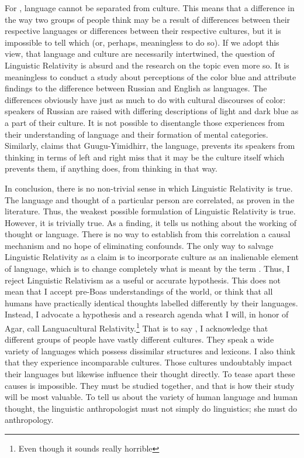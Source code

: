 \documentclass[doc,12pt]{apa6}
\begin{document}
For , language cannot be separated from culture. This means that
a difference in the way two groups of people think may be a result of
differences between their respective languages or differences between their
respective cultures, but it is impossible to tell which (or, perhaps,
meaningless to do so). If we adopt this view, that language and culture are
necessarily intertwined, the question of Linguistic Relativity is absurd and
the research on the topic even more so. It is meaningless to conduct a study
about perceptions of the color blue and attribute findings to the difference
between Russian and English as languages. The differences obviously have just
as much to do with cultural discourses of color: speakers of Russian are raised
with differing descriptions of light and dark blue as a part of their culture.
It is not possible to disentangle those experiences from their understanding of
language and their formation of mental categories. Similarly, claims that
Guugu-Yimidhirr, the language, prevents its speakers from thinking in terms of
left and right miss that it may be the culture itself which prevents them, if
anything does, from thinking in that way.

In conclusion, there is no non-trivial sense in which Linguistic Relativity is
true. The language and thought of a particular person are correlated, as proven
in the literature.  Thus, the weakest possible formulation of Linguistic
Relativity is true. However, it is trivially true. As a finding, it tells us
nothing about the working of thought or language. There is no way to establish
from this correlation a causal mechanism and no hope of eliminating confounds. 
The only way to salvage Linguistic Relativity as a claim is to incorporate
culture as an inalienable element of language, which is to change completely
what is meant by the term . Thus, I reject Linguistic Relativism as a useful or
accurate hypothesis. This does not mean that I accept pre-Boas understandings
of the world, or think that all humans have practically identical thoughts
labelled differently by their languages. Instead, I advocate a hypothesis and a
research agenda what I will, in honor of Agar, call Languacultural
Relativity.\footnote{Even though it sounds really horrible} That is to say , I
acknowledge that different groups of people have vastly different cultures.
They speak a wide variety of languages which possess dissimilar structures and
lexicons. I also think that they experience incomparable cultures. Those
cultures undoubtably 
impact their languages but likewise influence their thought directly. To tease
apart these causes is impossible. They must be studied together, and that is
how their study will be most valuable. To tell us about the variety of human
language and human thought, the linguistic anthropologist must not simply do
linguistics; she must do anthropology.
\end{document}
